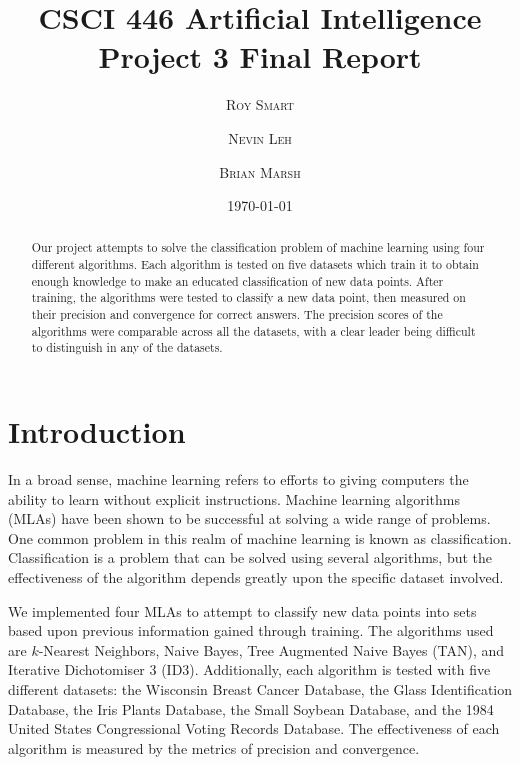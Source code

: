 \documentclass{article}
\title{\vspace{-15mm}\fontsize{24pt}{10pt}\selectfont\textbf{CSCI 446 Artificial Intelligence \\ Project 3 Final Report} \\[-2mm]} %
\date{\today}
\author{
\large
\textsc{Roy Smart} \and \textsc{Nevin Leh} \and \textsc{Brian Marsh}\\[2mm] %
}
\begin{document}
\maketitle %

\thispagestyle{fancy} %



\normalsize

\begin{abstract}

	Our project attempts to solve the classification problem of machine learning using four different algorithms.  
	Each algorithm is tested on five datasets which train it to obtain enough knowledge to make an educated classification of new data points.  
	After training, the algorithms were tested to classify a new data point, then measured on their precision and convergence for correct answers.  
	The precision scores of the algorithms were comparable across all the datasets, with a clear leader being difficult to distinguish in any of the datasets.
	
\end{abstract}
\section{Introduction}

	In a broad sense, machine learning refers to efforts to giving computers the ability to learn without explicit instructions. 
	Machine learning algorithms (MLAs) have been shown to be successful at solving a wide range of problems.  
	One common problem in this realm of machine learning is known as classification. 
	Classification is a problem that can be solved using several algorithms, but the effectiveness of the algorithm depends greatly upon the specific dataset involved.
	  
	We implemented four MLAs to attempt to classify new data points into sets based upon previous information gained through training.  
	The algorithms used are $k$-Nearest Neighbors, Naive Bayes, Tree Augmented Naive Bayes (TAN), and Iterative Dichotomiser 3 (ID3).  
	Additionally, each algorithm is tested with five different datasets: the Wisconsin Breast Cancer Database, the Glass Identification Database, the Iris Plants Database, the Small Soybean Database, and the 1984 United States Congressional Voting Records Database.  
	The effectiveness of each algorithm is measured by the metrics of precision and convergence.  
\end{document}
